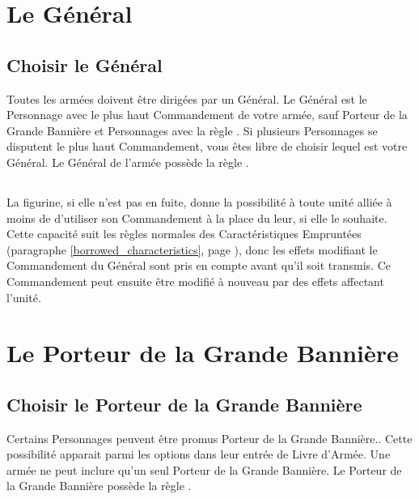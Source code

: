 \newpage
\section{Le Général}

\subsection{Choisir le Général}

Toutes les armées doivent être dirigées par un Général. Le Général est le Personnage avec le plus haut Commandement de votre armée, sauf Porteur de la Grande Bannière et Personnages avec la règle \notaleader{}. Si plusieurs Personnages se disputent le plus haut Commandement, vous êtes libre de choisir lequel est votre Général. Le Général de l'armée possède la règle \inspiringpresence{}.

\subsection{\inspiringpresence}

La figurine, si elle n'est pas en fuite, donne la possibilité à toute unité alliée à moins de  d'utiliser son Commandement à la place du leur, si elle le souhaite. Cette capacité suit les règles normales des Caractéristiques Empruntées (paragraphe \ref{borrowed_characteristics}, page \pageref{borrowed_characteristics}), donc les effets modifiant le Commandement du Général sont pris en compte avant qu'il soit transmis. Ce Commandement peut ensuite être modifié à nouveau par des effets affectant l'unité.

\section{Le Porteur de la Grande Bannière}

\subsection{Choisir le Porteur de la Grande Bannière}

Certains Personnages peuvent être promus Porteur de la Grande Bannière.. Cette possibilité apparait parmi les options dans leur entrée de Livre d'Armée. Une armée ne peut inclure qu'un seul Porteur de la Grande Bannière. Le Porteur de la Grande Bannière possède la règle \holdyourground{}.

\subsection{\holdyourground}

